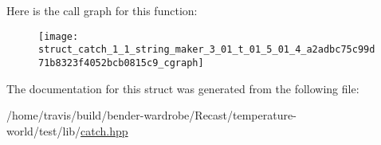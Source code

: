 Here is the call graph for this function\-:
\nopagebreak
\begin{figure}[H]
\begin{center}
\leavevmode
\texttt{[image: struct\_catch\_1\_1\_string\_maker\_3\_01\_t\_01\_5\_01\_4\_a2adbc75c99d71b8323f4052bcb0815c9\_cgraph]}
\end{center}
\end{figure}




The documentation for this struct was generated from the following file\-:\begin{DoxyCompactItemize}
\item 
/home/travis/build/bender-\/wardrobe/\-Recast/temperature-\/world/test/lib/\hyperlink{catch_8hpp}{catch.\-hpp}\end{DoxyCompactItemize}
